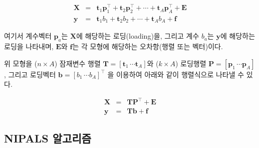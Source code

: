 \documentclass[
]{book}
\begin{document}
\begin{eqnarray}
\mathbf{X} &=& \mathbf{t}_1 \mathbf{p}_1^\top + \mathbf{t}_2 \mathbf{p}_2^\top + \cdots + \mathbf{t}_A \mathbf{p}_A^\top + \mathbf{E} \label{eq:plsr-x-single}\\
\mathbf{y} &=& \mathbf{t}_1 b_1 + \mathbf{t}_2 b_2 + \cdots + \mathbf{t}_A b_A + \mathbf{f} \label{eq:plsr-y-single}
\end{eqnarray}

여기서 계수벡터 \(\mathbf{p}_a\)는 \(\mathbf{X}\)에 해당하는 로딩(loading)을, 그리고 계수 \(b_a\)는 \(\mathbf{y}\)에 해당하는 로딩을 나타내며, \(\mathbf{E}\)와 \(\mathbf{f}\)는 각 모형에 해당하는 오차항(행렬 또는 벡터)이다.

위 모형을 (\(n \times A\)) 잠재변수 행렬 \(\mathbf{T} = \left[\mathbf{t}_1 \, \cdots \mathbf{t}_A \right]\)와 (\(k \times A\)) 로딩행렬 \(\mathbf{P} = \left[\mathbf{p}_1 \, \cdots \mathbf{p}_A \right]\), 그리고 로딩벡터 \(\mathbf{b} = \left[b_1 \, \cdots b_A \right]^\top\) 을 이용하여 아래와 같이 행렬식으로 나타낼 수 있다.

\begin{eqnarray}
\mathbf{X} &=& \mathbf{T}\mathbf{P}^\top + \mathbf{E} \label{eq:plsr-x-single-matrix}\\
\mathbf{y} &=& \mathbf{T}\mathbf{b} + \mathbf{f} \label{eq:plsr-y-single-matrix}
\end{eqnarray}

\hypertarget{plsr-single-nipals}{%
\subsection{NIPALS 알고리즘}\label{plsr-single-nipals}}
\end{document}
